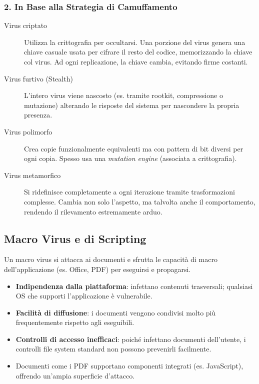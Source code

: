 \subsubsection{2. In Base alla Strategia di Camuffamento}
\begin{description}
    \item[Virus criptato] Utilizza la crittografia per occultarsi. Una porzione del virus genera una chiave casuale usata per cifrare il resto del codice, memorizzando la chiave col virus. Ad ogni replicazione, la chiave cambia, evitando firme costanti.
    \item[Virus furtivo (Stealth)] L'intero virus viene nascosto (es. tramite rootkit, compressione o mutazione) alterando le risposte del sistema per nascondere la propria presenza.
    \item[Virus polimorfo] Crea copie funzionalmente equivalenti ma con pattern di bit diversi per ogni copia. Spesso usa una \textit{mutation engine} (associata a crittografia).
    \item[Virus metamorfico] Si ridefinisce completamente a ogni iterazione tramite trasformazioni complesse. Cambia non solo l'aspetto, ma talvolta anche il comportamento, rendendo il rilevamento estremamente arduo.
\end{description}

\subsection{Macro Virus e di Scripting}

Un macro virus si attacca ai documenti e sfrutta le capacità di macro dell'applicazione (es. Office, PDF) per eseguirsi e propagarsi. 

\begin{warnbox}
\begin{itemize}
    \item \textbf{Indipendenza dalla piattaforma}: infettano contenuti trasversali; qualsiasi OS che supporti l'applicazione è vulnerabile.
    \item \textbf{Facilità di diffusione}: i documenti vengono condivisi molto più frequentemente rispetto agli eseguibili.
    \item \textbf{Controlli di accesso inefficaci}: poiché infettano documenti dell'utente, i controlli file system standard non possono prevenirli facilmente.
    \item Documenti come i PDF supportano componenti integrati (es. JavaScript), offrendo un'ampia superficie d'attacco.
\end{itemize}
\end{warnbox}

